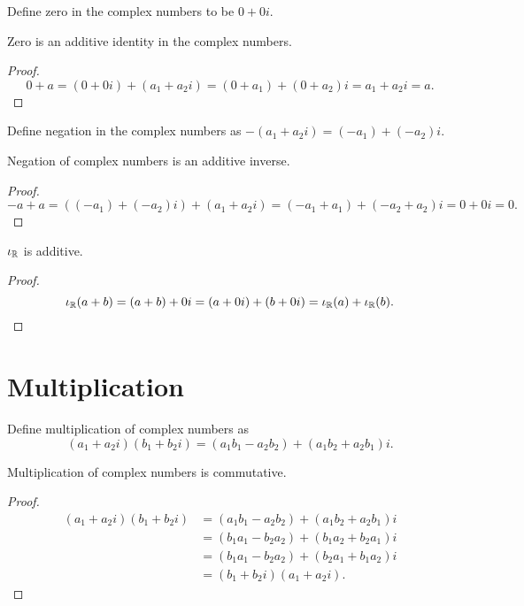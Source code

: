\documentclass[../../math.tex]{subfiles}
\begin{document}
\begin{instance}
    Define zero in the complex numbers to be $0 + 0i$.
\end{instance}

\begin{instance}
    Zero is an additive identity in the complex numbers.
\end{instance}
\begin{proof}
    \[
        0 + a
        = (0 + 0i) + (a_1 + a_2i)
        = (0 + a_1) + (0 + a_2)i
        = a_1 + a_2i = a.
    \]
\end{proof}

\begin{instance}
    Define negation in the complex numbers as $-(a_1 + a_2i) = (-a_1) +
    (-a_2)i$.
\end{instance}

\begin{instance}
    Negation of complex numbers is an additive inverse.
\end{instance}
\begin{proof}
    \[
        -a + a
        = ((-a_1) + (-a_2)i) + (a_1 + a_2i)
        = (-a_1 + a_1) + (-a_2 + a_2)i
        = 0 + 0i
        = 0.
    \]
\end{proof}

\begin{instance}
    $\iota_{\mathbb{R}}$ is additive.
\end{instance}
\begin{proof}
    \[
        \iota_{\mathbb{R}}(a + b) = (a + b) + 0i = (a + 0i) + (b + 0i) = \iota_{\mathbb{R}}(a) + \iota_{\mathbb{R}}(b).
    \]
\end{proof}

\section{Multiplication}

\begin{instance}
    Define multiplication of complex numbers as
    \[
        (a_1 + a_2i)(b_1 + b_2i) = (a_1b_1 - a_2b_2) + (a_1b_2 + a_2 b_1)i.
    \]
\end{instance}

\begin{instance}
    Multiplication of complex numbers is commutative.
\end{instance}
\begin{proof}
    \begin{align*}
        (a_1 + a_2i)(b_1 + b_2i)
        &= (a_1b_1 - a_2b_2) + (a_1b_2 + a_2 b_1)i \\
        &= (b_1a_1 - b_2a_2) + (b_1a_2 + b_2 a_1)i \\
        &= (b_1a_1 - b_2a_2) + (b_2 a_1 + b_1a_2)i \\
        &= (b_1 + b_2i)(a_1 + a_2i).
    \end{align*}
\end{proof}
\end{document}
